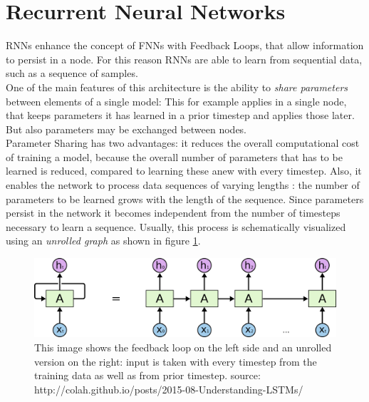 \documentclass[a4paper, 11pt]{report}
\begin{document}
\section{Recurrent Neural Networks}
RNNs enhance the concept of FNNs with Feedback Loops, that allow information to 
persist in a node. For this reason RNNs are able to learn from sequential data, 
such as a sequence of samples. \\
One of the main features of this architecture is the ability to \textit{share parameters} 
between elements of a single model: This for example applies in a single node, 
that keeps parameters it has learned in a prior timestep and applies those later. 
But also parameters may be exchanged between nodes. \\
Parameter Sharing has two advantages: it reduces the overall computational cost 
of training a model, because the overall number of parameters that has to be 
learned is reduced, compared to learning these anew with every timestep. Also, 
it enables the network to process data sequences of varying lengths
\cite[pp.367]{goodfellow2016deep}: the number 
of parameters to be learned grows with the length of the sequence. Since 
parameters persist in the network it becomes independent from the number of 
timesteps necessary to learn a sequence. Usually, this process is schematically 
visualized using an \textit{unrolled graph} as shown in figure \ref{fig1:unrolledgraph}.
\begin{figure}[h!]
    \includegraphics[width=\linewidth]{rnn_unrolled.png}
    \caption{This image shows the feedback loop on the left side and an unrolled 
    version on the right: input is taken with every timestep from the training data 
    as well as from prior timestep.
    source: http://colah.github.io/posts/2015-08-Understanding-LSTMs/
    }
    \label{fig1:unrolledgraph}
\end{figure}
\end{document}
